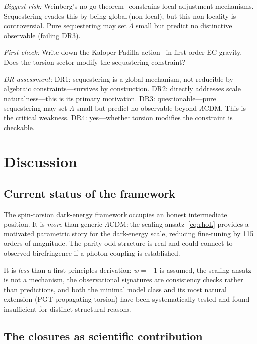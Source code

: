 \documentclass[aps,prd,twocolumn,superscriptaddress,showpacs,preprintnumbers,
  nofootinbib,longbibliography,floatfix]{revtex4-2}
\begin{document}
\textit{Biggest risk:}
Weinberg's no-go theorem~\cite{Weinberg1989} constrains local adjustment
mechanisms. Sequestering evades this by being global (non-local), but
this non-locality is controversial. Pure sequestering may set $\Lambda$
small but predict no distinctive observable (failing DR3).

\textit{First check:}
Write down the Kaloper-Padilla action~\cite{KaloPerPadilla2014}
in first-order EC gravity. Does the torsion sector modify the
sequestering constraint?

\textit{DR assessment:}
DR1: sequestering is a global mechanism, not reducible by algebraic
constraints---survives by construction.
DR2: directly addresses scale naturalness---this is its primary
motivation.
DR3: questionable---pure sequestering may set $\Lambda$ small but predict
no observable beyond $\Lambda$CDM. This is the critical weakness.
DR4: yes---whether torsion modifies the constraint is checkable.


\section{Discussion}\label{sec:discussion}

\subsection{Current status of the framework}

The spin-torsion dark-energy framework occupies an honest intermediate
position. It is \textit{more} than generic $\Lambda$CDM: the scaling
ansatz~\eqref{eq:rhoL} provides a motivated parametric story for the
dark-energy scale, reducing fine-tuning by 115 orders of magnitude.
The parity-odd structure is real and could connect to observed
birefringence if a photon coupling is established.

It is \textit{less} than a first-principles derivation: $w = -1$ is
assumed, the scaling ansatz is not a mechanism, the observational
signatures are consistency checks rather than predictions, and
both the minimal model class and its most natural extension (PGT
propagating torsion) have been systematically tested and found
insufficient for distinct structural reasons.

\subsection{The closures as scientific contribution}
\end{document}
